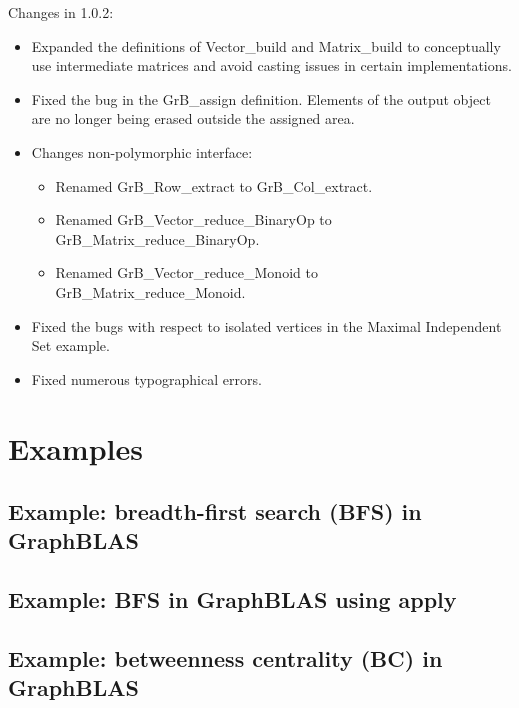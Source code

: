 
Changes in 1.0.2:
\begin{itemize}
\item Expanded the definitions of {\sf Vector\_build} and {\sf Matrix\_build} to conceptually use intermediate matrices and avoid casting issues in certain implementations.
\item Fixed the bug in the {\sf GrB\_assign} definition. Elements of the output object are no longer being erased outside the assigned area.
\item Changes non-polymorphic interface:
    \begin{itemize}
    \item Renamed {\sf GrB\_Row\_extract} to {\sf GrB\_Col\_extract}.
    \item Renamed {\sf GrB\_Vector\_reduce\_BinaryOp} to {\sf GrB\_Matrix\_reduce\_BinaryOp}.
    \item Renamed {\sf GrB\_Vector\_reduce\_Monoid} to {\sf GrB\_Matrix\_reduce\_Monoid}.
    \end{itemize}
\item Fixed the bugs with respect to isolated vertices in the Maximal Independent Set example.
\item Fixed numerous typographical errors.
\end{itemize}  

\chapter{Examples}
\label{Chp:Examples}

\pagebreak
\nolinenumbers
\section{Example: breadth-first search (BFS) in GraphBLAS}
{\scriptsize

}
\vfill

\pagebreak
\nolinenumbers
\section{Example: BFS in GraphBLAS using apply}
{\scriptsize

}

\pagebreak
\nolinenumbers
\section{Example: betweenness centrality (BC) in GraphBLAS}
{\scriptsize

}

